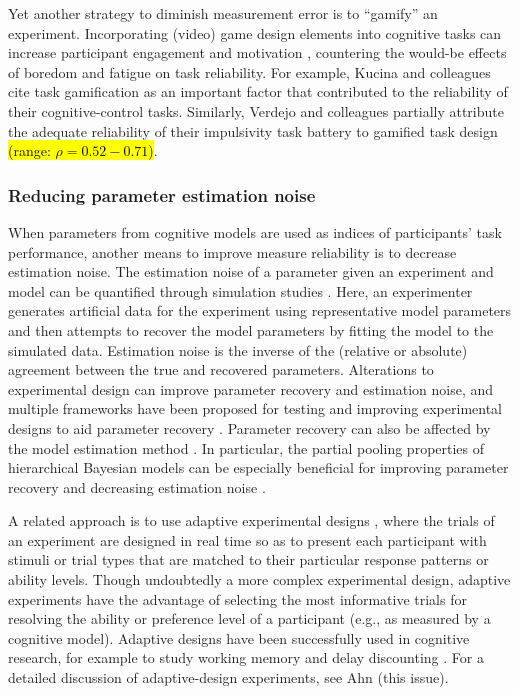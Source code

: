 \documentclass[a4paper,12pt]{article}
\begin{document}
Yet another strategy to diminish measurement error is to ``gamify'' an experiment. Incorporating (video) game design elements into cognitive tasks can increase participant engagement and motivation \cite{sailer2017gamification}, countering the would-be effects of boredom and fatigue on task reliability. For example, Kucina and colleagues \cite{kucina2022solution} cite task gamification as an important factor that contributed to the reliability of their cognitive-control tasks. Similarly, Verdejo and colleagues \cite{verdejo2021unified} partially attribute the adequate reliability of their impulsivity task battery to gamified task design \hl{(range: $\rho = 0.52 - 0.71$)}. 

\subsubsection{Reducing parameter estimation noise}

When parameters from cognitive models are used as indices of participants' task performance, another means to improve measure reliability is to decrease estimation noise. The estimation noise of a parameter given an experiment and model can be quantified through simulation studies \cite{wilson2019ten, palminteri2017importance}. Here, an experimenter generates artificial data for the experiment using representative model parameters and then attempts to recover the model parameters by fitting the model to the simulated data. Estimation noise is the inverse of the (relative or absolute) agreement between the true and recovered parameters. Alterations to experimental design can improve parameter recovery and estimation noise, and multiple frameworks have been proposed for testing and improving experimental designs to aid parameter recovery \cite{broomell2014parameter, melinscak2020computational}. Parameter recovery can also be affected by the model estimation method \cite{Lerche2017-yg, waltmann2022sufficient}. In particular, the partial pooling properties of hierarchical Bayesian models can be especially beneficial for improving parameter recovery and decreasing estimation noise \cite{katahira2016hierarchical}.

A related approach is to use adaptive experimental designs \cite{myung2013tutorial}, where the trials of an experiment are designed in real time so as to present each participant with stimuli or trial types that are matched to their particular response patterns or ability levels. Though undoubtedly a more complex experimental design, adaptive experiments have the advantage of selecting the most informative trials for resolving the ability or preference level of a participant (e.g., as measured by a cognitive model). Adaptive designs have been successfully used in cognitive research, for example to study working memory \cite{gonthier2018measuring} and delay discounting \cite{ahn2020rapid}. For a detailed discussion of adaptive-design experiments, see Ahn (this issue). 
\end{document}

